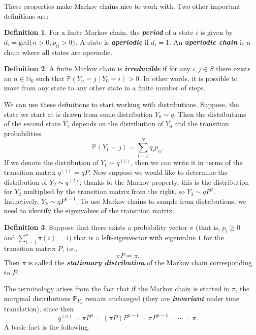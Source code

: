 \documentclass[
]{book}
\theoremstyle{definition}
\newtheorem{definition}{Definition}[chapter]
\theoremstyle{definition}
\theoremstyle{definition}
\theoremstyle{definition}
\theoremstyle{remark}
\begin{document}
These properties make Markov chains nice to work with. Two other important definitions are:

\begin{definition}
For a finite Markov chain, the \textbf{\emph{period}} of a state \(i\) is given by \(d_i = \textrm{gcd}\{n > 0; p_{ii} > 0 \}\). A state is \textbf{\emph{aperiodic}} if \(d_i = 1\). An \textbf{\emph{aperiodic chain}} is a chain where all states are aperiodic.
\end{definition}

\begin{definition}
A finite Markov chain is \textbf{\emph{irreducible}} if for any \(i,j \in S\) there exists an \(n \in \mathbb{N}_0\) such that \(\mathbb{P} (Y_n = j \mid Y_0 = i) > 0\). In other words, it is possible to move from any state to any other state in a finite number of steps.
\end{definition}

We can use these definitions to start working with distributions. Suppose, the state we start at is drawn from some distribution \(Y_0 \sim q\). Then the distributions of the second state \(Y_1\) depends on the distribution of \(Y_0\) and the transition probabilities
\[
\mathbb{P}(Y_1 = j) = \sum_{i=1}^N q_ip_{ij}.
\]
If we denote the distribution of \(Y_1 \sim {q}^{(1)}\), then we can write it in terms of the transition matrix \({q}^{(1)} = {q}P\). Now suppose we would like to determine the distribution of \(Y_2 \sim {q}^{(2)}\); thanks to the Markov property, this is the distribution for \(Y_2\) multiplied by the transition matrix from the right, so \(Y_3 \sim qP^2\). Inductively, \(Y_k \sim qP^{k-1}\). To use Markov chains to sample from distributions, we need to identify the eigenvalues of the transition matrix.

\begin{definition}
Suppose that there exists a probability vector \(\pi\) (that is, \(p_i \geq 0\) and \(\sum_{i=1}^n \pi(i) = 1\)) that is a left-eigenvector with eigenvalue \(1\) for the transition matrix \(P\), i.e.,
\[
\pi P = \pi. 
\]
Then \(\pi\) is called the \textbf{\emph{stationary distribution}} of the Markov chain corresponding to \(P\).
\end{definition}

The terminology arises from the fact that if the Markov chain is started in \(\pi\), the marginal distributions \(\mathbb{P}_{Y_n}\) remain unchanged (they are \textbf{\emph{invariant}} under time translation), since then
\[q^{(n)} = \pi P^n = (\pi P)P^{n-1} = \pi P^{n-1}  = \cdots = \pi.\]
A basic fact is the following.
\end{document}
